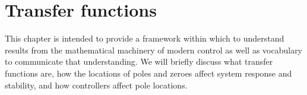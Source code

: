 
\chapter{Transfer functions}

This chapter is intended to provide a framework within which to understand
results from the mathematical machinery of modern control as well as vocabulary
to communicate that understanding. We will briefly discuss what transfer
functions are, how the locations of poles and zeroes affect
\gls{system response} and stability, and how controllers affect pole locations.

\renewcommand*{\chapterpath}{\partpath/transfer-functions}





